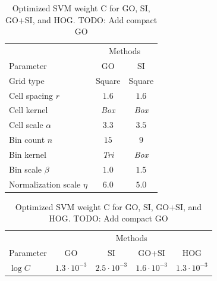 \documentclass[thesis.tex]{subfiles}
\begin{document}
\begin{table}[p]
\centering
\begin{tabular}{ l c c }
\toprule
{} & \multicolumn{2}{c}{Methods} \\
Parameter & GO & SI \\ \midrule
Grid type & Square & Square \\
Cell spacing $r$ & $1.6$ & $1.6$ \\
Cell kernel & \textit{Box} & \textit{Box} \\
Cell scale $\alpha$ & $3.3$ & $3.5$ \\
Bin count $n$ & $15$ & $9$ \\
Bin kernel & \textit{Tri} & \textit{Box} \\
Bin scale $\beta$ & $1.0$ & $1.5$ \\
Normalization scale $\eta$ & $6.0$ & $5.0$ \\
\bottomrule
\end{tabular}
\caption{Optimized parameters from our parameter study for GO and SI.}
\label{tbl:INRIAparams}
%
\vspace{5mm}
%
\begin{tabular}{ l c c c c }
\toprule
{} & \multicolumn{4}{c}{Methods} \\
Parameter & GO & SI & GO+SI & HOG \\ \midrule
$\log C$ & $1.3\cdot 10^{-3}$ & $2.5\cdot 10^{-3}$ & $1.6\cdot 10^{-3}$ & $1.3\cdot 10^{-3}$ \\
\bottomrule
\end{tabular}
\caption{Optimized SVM weight C for GO, SI, GO+SI, and HOG. TODO: Add compact GO}
\label{tbl:INRIAparamC}
\end{table}
%
\end{document}
